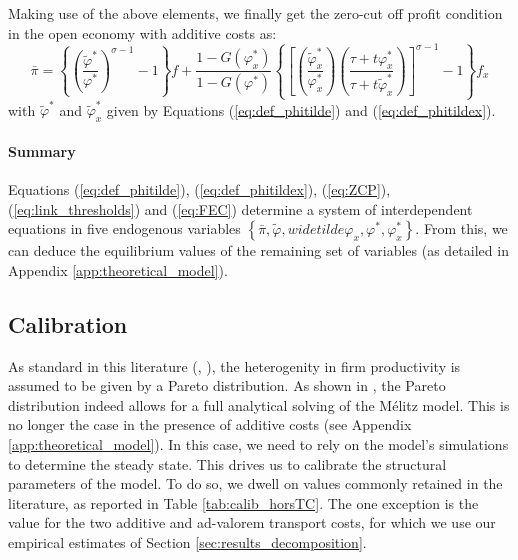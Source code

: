 \documentclass[a4paper,11pt]{article}
\begin{document}
Making use of the above elements, we finally get the zero-cut off profit condition in the open economy with additive costs as:
\begin{equation}
\bar{\pi} = \left\{\left(\frac{\widetilde{\varphi}^\ast}{\varphi^\ast}\right)^{\sigma-1}-1 \right\}f +  \frac{1-G(\varphi_x^\ast)}{1-G(\varphi^\ast)}\left\{\left[\left(\frac{\widetilde{\varphi}_x^\ast}{\varphi_x^\ast}\right)\left(\frac{\tau+ t \varphi^\ast_x}{\tau+ t \widetilde{\varphi}^\ast_x}\right)\right]^{\sigma-1}-1 \right\}f_x \label{eq:ZCP}
\end{equation}
\noindent with $\widetilde{\varphi}^\ast$ and $\widetilde{\varphi}_x^\ast$ given by Equations (\ref{eq:def_phitilde}) and (\ref{eq:def_phitildex}).

\paragraph{Summary} Equations (\ref{eq:def_phitilde}), (\ref{eq:def_phitildex}), (\ref{eq:ZCP}), (\ref{eq:link_thresholds}) and (\ref{eq:FEC}) determine a system of interdependent equations in five endogenous variables $\left\{\bar{\pi}, \widetilde{\varphi}, widetilde{\varphi}_x, \varphi^\ast, \varphi^\ast_x \right\}$. From this, we can deduce the equilibrium values of the remaining set of variables (as detailed in Appendix \ref{app:theoretical_model}).



\subsection{Calibration}

As standard in this literature (\cite{Irrazabal_2015}, \cite{melitz-redding-Handbk-IT-2014}), the heterogenity in firm productivity is assumed to be given by a Pareto distribution. As shown in \cite{melitz-redding-Handbk-IT-2014}, the Pareto distribution indeed allows for a full analytical solving of the M\'{e}litz model. This is no longer the case in the presence of additive costs (see Appendix \ref{app:theoretical_model}). In this case, we need to rely on the model's simulations to determine the steady state. This drives us to calibrate the structural parameters of the model. To do so, we dwell on values commonly retained in the literature, as reported in Table \ref{tab:calib_horsTC}. The one exception is the value for the two additive and ad-valorem transport costs, for which we use our empirical estimates of Section \ref{sec:results_decomposition}.
\end{document}
